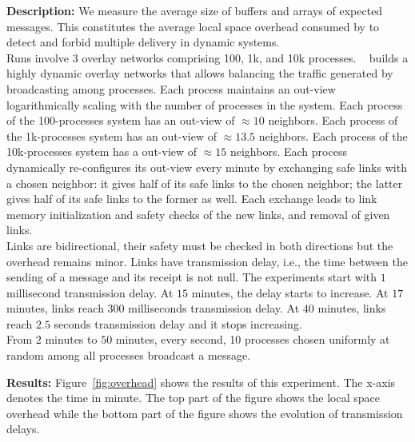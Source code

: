 \noindent \textbf{Description:} We measure the average size of buffers and
arrays of expected messages. This constitutes the average local space overhead
consumed by \RPCBROADCAST to detect and forbid multiple delivery in dynamic
systems.\\
Runs involve 3 overlay networks comprising 100, 1k, and 10k
processes. \SPRAY~\cite{nedelec2017adaptive} builds a highly dynamic overlay
networks that allows balancing the traffic generated by broadcasting among
processes. Each process maintains an out-view logarithmically scaling with the
number of processes in the system. Each process of the 100-processes system has
an out-view of $\approx 10$ neighbors. Each process of the 1k-processes system
has an out-view of $\approx 13.5$ neighbors. Each process of the 10k-processes
system has a out-view of $\approx 15$ neighbors. Each process dynamically
re-configures its out-view every minute by exchanging safe links with a chosen
neighbor: it gives half of its safe links to the chosen neighbor; the latter
gives half of its safe links to the former as well. Each exchange leads to link
memory initialization and safety checks of the new links,
and removal of given links.\\
Links are bidirectional, their safety must be checked in both directions but the
overhead remains minor. Links have transmission delay, i.e., the time between
the sending of a message and its receipt is not null. The experiments start with
$1$ millisecond transmission delay. At $15$ minutes, the delay starts to
increase. At $17$ minutes, links reach $300$ milliseconds transmission delay. At
$40$ minutes,
links reach $2.5$ seconds transmission delay and it stops increasing.\\
From $2$ minutes to $50$ minutes, every second, 10 processes chosen uniformly at
random among all processes broadcast a message.

\noindent \textbf{Results:} Figure~\ref{fig:overhead} shows the results of this
experiment. The x-axis denotes the time in minute. The top part of the figure
shows the local space overhead while the bottom part of the figure shows the
evolution of transmission delays.

